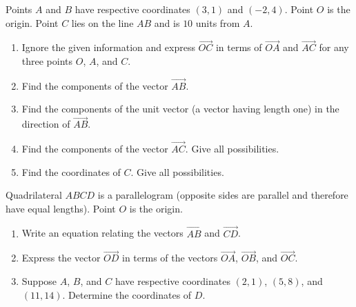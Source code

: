 \documentclass{ximera}
\begin{document}
\begin{example} \label{Exkdk32k21}
Points $A$ and $B$ have respective coordinates $(3,1)$ and $(-2,4)$. Point $O$ is the origin. Point $C$ lies on the line $AB$ and is $10$ units from $A$.


\begin{enumerate}
\item Ignore the given information and express $\overrightarrow{OC}$ in terms of $\overrightarrow{OA}$ and $\overrightarrow{AC}$ for any three points $O$, $A$, and $C$.

\item Find the components of the vector $\overrightarrow{AB}$.

\item Find the components of the unit vector (a vector having length one) in the direction of $\overrightarrow{AB}$.

\item Find the components of the vector $\overrightarrow{AC}$. Give all possibilities.

\item Find the coordinates of $C$. Give all possibilities.
\end{enumerate}
\end{example}

\begin{example} \label{Exf3r3rnms}
Quadrilateral $ABCD$ is a parallelogram (opposite sides are parallel and therefore have equal lengths). Point $O$ is the origin.

\begin{enumerate}
\item Write an equation relating the vectors  $\overrightarrow{AB}$ and $\overrightarrow{CD}$.

\item Express the vector $\overrightarrow{OD}$ in terms of the vectors $\overrightarrow{OA}$, $\overrightarrow{OB}$, and $\overrightarrow{OC}$.

\item Suppose $A$, $B$, and $C$ have respective coordinates $(2,1)$, $(5,8)$, and $(11,14)$. Determine the coordinates of $D$. 
\end{enumerate}
\end{example}
\end{document}
